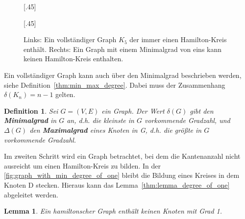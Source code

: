 \documentclass{article}
\newtheorem{mydef}{Definition}
\newtheorem{mylem}{Lemma}
\begin{document}
\begin{figure}[h]
	\centering
	\subcaptionbox{\label{fig:pentagon_graph}}[.45\linewidth]
	{
	}
	\hfill
	\subcaptionbox{\label{fig:graph_with_min_degree_of_one}}[.45\linewidth]
	{
	}
	\caption{Links: Ein vollständiger Graph $K_5$ der immer einen Hamilton-Kreis enthält. Rechts: Ein Graph mit einem Minimalgrad von eins kann keinen Hamilton-Kreis enthalten.}
\end{figure}

Ein vollständiger Graph kann auch über den Minimalgrad beschrieben werden, siehe Definition~\autoref{thm:min_max_degree}. Dabei muss der Zusammenhang $\delta(K_n) = n-1$ gelten.

\begin{mydef}\label{thm:min_max_degree}
	Sei $G=(V,E)$ ein Graph. Der Wert $\delta(G)$ gibt den \textbf{Minimalgrad} in $G$ an, d.h. die kleinste in $G$ vorkommende Gradzahl, und $\Delta(G)$ den \textbf{Maximalgrad} eines Knoten in G, d.h. die größte in $G$ vorkommende Gradzahl. \cite{busing2010graphen}
\end{mydef}

Im zweiten Schritt wird ein Graph betrachtet, bei dem die Kantenanzahl nicht ausreicht um einen Hamilton-Kreis zu bilden. In der \autoref{fig:graph_with_min_degree_of_one} bleibt die Bildung eines Kreises in dem Knoten D stecken. Hieraus kann das Lemma~\autoref{thm:lemma_degree_of_one} abgeleitet werden.

\begin{mylem}\label{thm:lemma_degree_of_one}
	Ein hamiltonscher Graph enthält keinen Knoten mit Grad 1. \cite{busing2010graphen}
\end{mylem}

\end{document}
